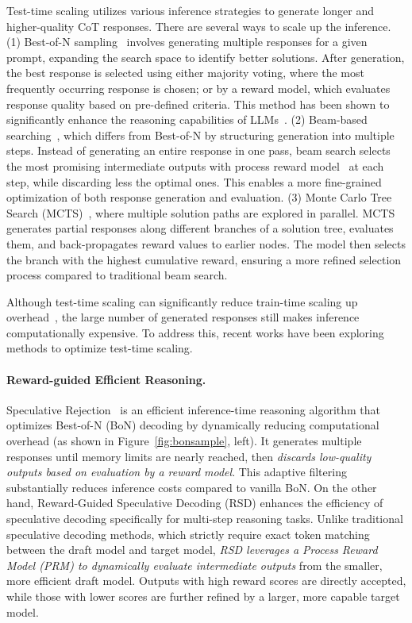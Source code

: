 Test-time scaling utilizes various inference strategies to generate longer and higher-quality CoT responses. There are several ways to scale up the inference. (1) Best-of-N sampling~\cite{sun2024fast, wang2025sampling} involves generating multiple responses for a given prompt, expanding the search space to identify better solutions. After generation, the best response is selected using either majority voting, where the most frequently occurring response is chosen; or by a reward model, which evaluates response quality based on pre-defined criteria. This method has been shown to significantly enhance the reasoning capabilities of LLMs~\cite{beeching2024scalingtesttimecompute}. (2) Beam-based searching~\cite{ding2025dynamic, fu2024efficiently,beeching2024scalingtesttimecompute}, which differs from Best-of-N by structuring generation into multiple steps. Instead of generating an entire response in one pass, beam search selects the most promising intermediate outputs with process reward model~\cite{uesato2022solving} at each step, while discarding less the optimal ones. This enables a more fine-grained optimization of both response generation and evaluation. (3) Monte Carlo Tree Search (MCTS)~\cite{li2025fastmcts}, where multiple solution paths are explored in parallel. MCTS generates partial responses along different branches of a solution tree, evaluates them, and back-propagates reward values to earlier nodes. The model then selects the branch with the highest cumulative reward, ensuring a more refined selection process compared to traditional beam search.

Although test-time scaling can significantly reduce train-time scaling up overhead~\cite{beeching2024scalingtesttimecompute}, the large number of generated responses still makes inference computationally expensive. To address this, recent works have been exploring methods to optimize test-time scaling.

\paragraph{Reward-guided Efficient Reasoning.}
%
Speculative Rejection~\cite{sun2024fast} is an efficient inference-time reasoning algorithm that optimizes Best-of-N (BoN) decoding by dynamically reducing computational overhead (as shown in Figure~\ref{fig:bonsample}, left). It generates multiple responses until memory limits are nearly reached, then \textit{discards low-quality outputs based on evaluation by a reward model}. This adaptive filtering substantially reduces inference costs compared to vanilla BoN.
%
On the other hand, Reward-Guided Speculative Decoding (RSD) \cite{liao2025reward} enhances the efficiency of speculative decoding specifically for multi-step reasoning tasks. Unlike traditional speculative decoding methods, which strictly require exact token matching between the draft model and target model, \textit{RSD leverages a Process Reward Model (PRM) to dynamically evaluate intermediate outputs} from the smaller, more efficient draft model. Outputs with high reward scores are directly accepted, while those with lower scores are further refined by a larger, more capable target model.

